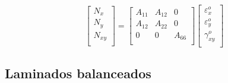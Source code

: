 \begin{equation} \label{eq_result_loadingA}
\begin{bmatrix}
    N_{x} \\
    N_{y} \\
    N_{xy} \\
\end{bmatrix}
=
\begin{bmatrix}
    A_{11} & A_{12} & 0\\
    A_{12} & A_{22} & 0\\
    0 & 0 & A_{66}\\
\end{bmatrix}
\begin{bmatrix}
    \varepsilon_{x}^o \\
    \varepsilon_{y}^o \\
    \gamma_{xy}^o \\
\end{bmatrix}
\end{equation}

\subsection{Laminados balanceados}
